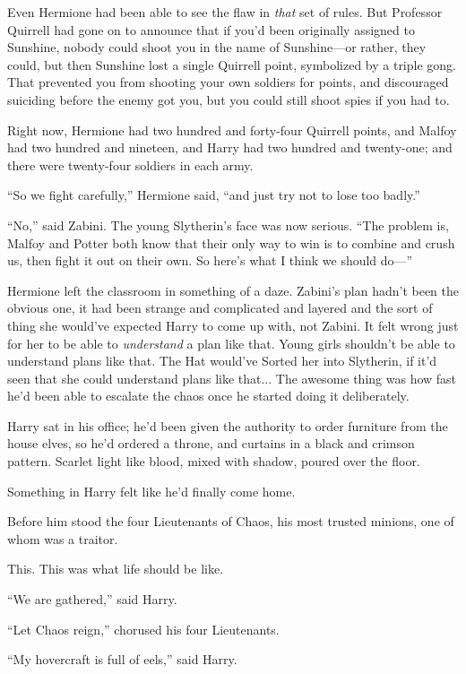 Even Hermione had been able to see the flaw in \emph{that} set of rules. But Professor Quirrell had gone on to announce that if you’d been originally assigned to Sunshine, nobody could shoot you in the name of Sunshine—or rather, they could, but then Sunshine lost a single Quirrell point, symbolized by a triple gong. That prevented you from shooting your own soldiers for points, and discouraged suiciding before the enemy got you, but you could still shoot spies if you had to.

Right now, Hermione had two hundred and forty-four Quirrell points, and Malfoy had two hundred and nineteen, and Harry had two hundred and twenty-one; and there were twenty-four soldiers in each army.

“So we fight carefully,” Hermione said, “and just try not to lose too badly.”

“No,” said Zabini. The young Slytherin’s face was now serious. “The problem is, Malfoy and Potter both know that their only way to win is to combine and crush us, then fight it out on their own. So here’s what I think we should do—”

Hermione left the classroom in something of a daze. Zabini’s plan hadn’t been the obvious one, it had been strange and complicated and layered and the sort of thing she would’ve expected Harry to come up with, not Zabini. It felt wrong just for her to be able to \emph{understand} a plan like that. Young girls shouldn’t be able to understand plans like that. The Hat would’ve Sorted her into Slytherin, if it’d seen that she could understand plans like that...
\sbreak
The awesome thing was how fast he’d been able to escalate the chaos once he started doing it deliberately.

Harry sat in his office; he’d been given the authority to order furniture from the house elves, so he’d ordered a throne, and curtains in a black and crimson pattern. Scarlet light like blood, mixed with shadow, poured over the floor.

Something in Harry felt like he’d finally come home.

Before him stood the four Lieutenants of Chaos, his most trusted minions, one of whom was a traitor.

This. This was what life should be like.

“We are gathered,” said Harry.

“Let Chaos reign,” chorused his four Lieutenants.

“My hovercraft is full of eels,” said Harry.

